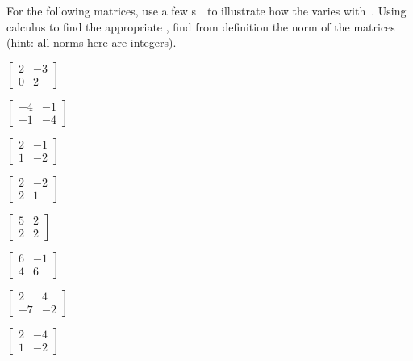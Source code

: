 \begin{exercise} 
For the following matrices, use a few s~\xv\ to illustrate how the  varies with~\xv.
Using calculus to find the appropriate , find from definition the norm of the matrices (hint: all norms here are integers).
\begin{Parts}
\item \(\begin{bmatrix} 2&-3\\0&2 \end{bmatrix}\)
\item \(\begin{bmatrix} -4&-1\\-1&-4 \end{bmatrix}\)
\item \(\begin{bmatrix} 2&-1\\1&-2 \end{bmatrix}\)
\item \(\begin{bmatrix} 2&-2\\2&1 \end{bmatrix}\)
\begin{OmitV1}
\item \(\begin{bmatrix} 5&2\\2&2 \end{bmatrix}\)
\item \(\begin{bmatrix} 6&-1\\4&6 \end{bmatrix}\)
\item \(\begin{bmatrix} 2&4\\-7&-2 \end{bmatrix}\)
\item \(\begin{bmatrix} 2&-4\\1&-2 \end{bmatrix}\)
\end{OmitV1}
\end{Parts}

\end{exercise}




